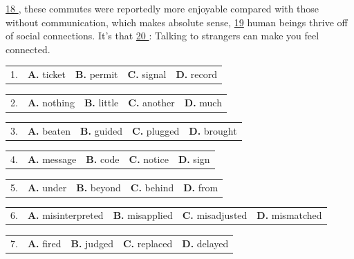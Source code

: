 \documentclass[UTF8,11pt]{ctexart}
\begin{document}
\uline{18 }, these commutes were reportedly more enjoyable compared with those without communication, which makes absolute sense, \uline{19} human beings thrive off of social connections. It’s that \uline{20 }: Talking to strangers can make you feel connected.


\noindent\begin{tabularx}{\linewidth}{@{}lXXXX@{}}1. & \textbf{A.} ticket & \textbf{B.} permit & \textbf{C.} signal & \textbf{D.} record\\\end{tabularx}\par

\noindent\begin{tabularx}{\linewidth}{@{}lXXXX@{}}2. & \textbf{A.} nothing & \textbf{B.} little & \textbf{C.} another & \textbf{D.} much\\\end{tabularx}\par

\noindent\begin{tabularx}{\linewidth}{@{}lXXXX@{}}3. & \textbf{A.} beaten & \textbf{B.} guided & \textbf{C.} plugged & \textbf{D.} brought\\\end{tabularx}\par

\noindent\begin{tabularx}{\linewidth}{@{}lXXXX@{}}4. & \textbf{A.} message & \textbf{B.} code & \textbf{C.} notice & \textbf{D.} sign\\\end{tabularx}\par

\noindent\begin{tabularx}{\linewidth}{@{}lXXXX@{}}5. & \textbf{A.} under & \textbf{B.} beyond & \textbf{C.} behind & \textbf{D.} from\\\end{tabularx}\par

\noindent\begin{tabularx}{\linewidth}{@{}lXXXX@{}}6. & \textbf{A.} misinterpreted & \textbf{B.} misapplied & \textbf{C.} misadjusted & \textbf{D.} mismatched\\\end{tabularx}\par

\noindent\begin{tabularx}{\linewidth}{@{}lXXXX@{}}7. & \textbf{A.} fired & \textbf{B.} judged & \textbf{C.} replaced & \textbf{D.} delayed\\\end{tabularx}\par
\end{document}
